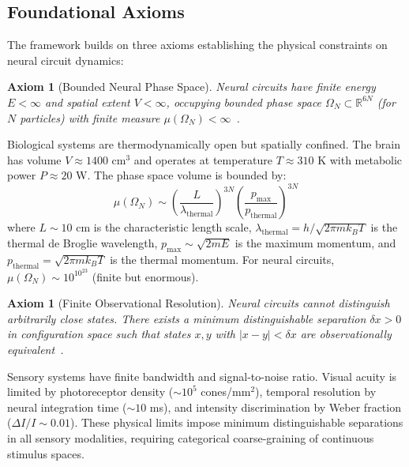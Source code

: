 \documentclass[aps,prd,twocolumn,superscriptaddress,floatfix,nofootinbib]{revtex4-2}
\newtheorem{axiom}[theorem]{Axiom}
\theoremstyle{remark}
\begin{document}
\subsection{Foundational Axioms}

The framework builds on three axioms establishing the physical constraints on neural circuit dynamics:

\begin{axiom}[Bounded Neural Phase Space]
\label{ax:bounded_neural}
Neural circuits have finite energy $E < \infty$ and spatial extent $V < \infty$, occupying bounded phase space $\Omega_N \subset \mathbb{R}^{6N}$ (for $N$ particles) with finite measure $\mu(\Omega_N) < \infty$~\cite{landau1980statistical,callen1985thermodynamics}.
\end{axiom}

\begin{justification}
Biological systems are thermodynamically open but spatially confined. The brain has volume $V \approx 1400$ cm$^3$ and operates at temperature $T \approx 310$ K with metabolic power $P \approx 20$ W. The phase space volume is bounded by:
$$
\mu(\Omega_N) \sim \left(\frac{L}{\lambda_{\text{thermal}}}\right)^{3N} \left(\frac{p_{\text{max}}}{p_{\text{thermal}}}\right)^{3N}
$$
where $L \sim 10$ cm is the characteristic length scale, $\lambda_{\text{thermal}} = h/\sqrt{2\pi m k_B T}$ is the thermal de Broglie wavelength, $p_{\text{max}} \sim \sqrt{2mE}$ is the maximum momentum, and $p_{\text{thermal}} = \sqrt{2\pi m k_B T}$ is the thermal momentum. For neural circuits, $\mu(\Omega_N) \sim 10^{10^{23}}$ (finite but enormous).
\end{justification}

\begin{axiom}[Finite Observational Resolution]
\label{ax:finite_resolution}
Neural circuits cannot distinguish arbitrarily close states. There exists a minimum distinguishable separation $\delta x > 0$ in configuration space such that states $x, y$ with $|x - y| < \delta x$ are observationally equivalent~\cite{harnad1987categorical,goldstone1998perceptual}.
\end{axiom}

\begin{justification}
Sensory systems have finite bandwidth and signal-to-noise ratio. Visual acuity is limited by photoreceptor density ($\sim 10^5$ cones/mm$^2$), temporal resolution by neural integration time ($\sim 10$ ms), and intensity discrimination by Weber fraction ($\Delta I / I \sim 0.01$). These physical limits impose minimum distinguishable separations in all sensory modalities, requiring categorical coarse-graining of continuous stimulus spaces.
\end{justification}
\end{document}
